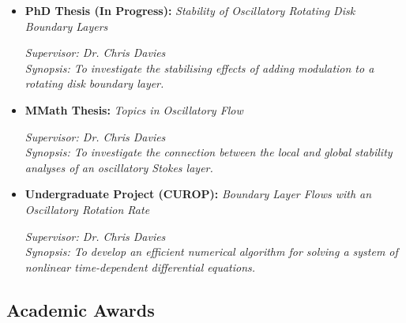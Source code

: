 \documentclass[11pt,a4paper,sans]{moderncv}        %
\begin{document}
\begin{itemize}

\item{\textbf{PhD Thesis (In Progress):} \textit{Stability of Oscillatory Rotating Disk Boundary Layers}

\vspace{3pt}

\small{\textit{Supervisor: Dr. Chris Davies \\
Synopsis: To investigate the stabilising effects of adding modulation to a rotating disk boundary layer.}}}

\vspace{10pt}

\item{\textbf{MMath Thesis:} \textit{Topics in Oscillatory Flow}

\vspace{3pt}

\small{\textit{Supervisor: Dr. Chris Davies \\
Synopsis: To investigate the connection between the local and global stability analyses of an oscillatory Stokes layer.}}}

\vspace{10pt}

\item{\textbf{Undergraduate Project (CUROP): }\textit{Boundary Layer Flows with an Oscillatory Rotation Rate}

\vspace{3pt}

\small{\textit{Supervisor: Dr. Chris Davies \\
Synopsis: To develop an efficient numerical algorithm for solving a system of nonlinear time-dependent differential equations.}}}

\end{itemize}

\vspace{10pt}

\subsection{Academic Awards}

\vspace{5pt}
\end{document}
